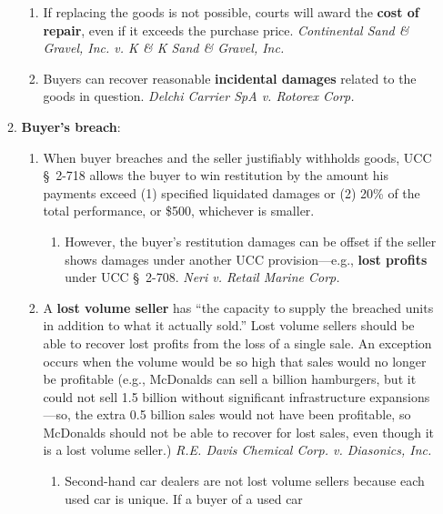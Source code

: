 \begin{enumerate}
\begin{enumerate}
\begin{enumerate}
            \item If replacing the goods is not possible, courts will award 
            the \textbf{cost of repair}, even if it exceeds the purchase 
            price.  \emph{Continental Sand \& Gravel, Inc. v. K \& K Sand \& 
            Gravel, Inc.}
            \item Buyers can recover reasonable \textbf{incidental damages} 
            related to the goods in question. \emph{Delchi Carrier SpA v. 
            Rotorex Corp.}
        \end{enumerate}
        \item \textbf{Buyer's breach}:
        \begin{enumerate}
            \item When buyer breaches and the seller justifiably withholds 
            goods, UCC \S\ 2-718 allows the buyer to win restitution by the 
            amount his payments exceed (1) specified liquidated damages or (2) 
            20\% of the total performance, or \$500, whichever is smaller.
            \begin{enumerate}
                \item However, the buyer's restitution damages can be offset 
                if the seller shows damages under another UCC 
                provision---e.g., \textbf{lost profits} under UCC \S\ 2-708. 
                \emph{Neri v. Retail Marine Corp.}
            \end{enumerate}
            \item A \textbf{lost volume seller} has ``the capacity to supply 
            the breached units in addition to what it actually sold.'' Lost 
            volume sellers should be able to recover lost profits from the 
            loss of a single sale. An exception occurs when the volume would 
            be so high that sales would no longer be profitable (e.g., 
            McDonalds can sell a billion hamburgers, but it could not sell 1.5 
            billion without significant infrastructure expansions---so, the 
            extra 0.5 billion sales would not have been profitable, so 
            McDonalds should not be able to recover for lost sales, even 
            though it is a lost volume seller.) \emph{R.E. Davis Chemical Corp. 
            v. Diasonics, Inc.}
            \begin{enumerate}
                \item Second-hand car dealers are not lost volume sellers 
                because each used car is unique. If a buyer of a used car 

\end{enumerate}
\end{enumerate}
\end{enumerate}
\end{enumerate}
